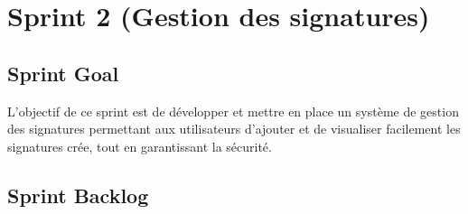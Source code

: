 \section{Sprint 2 (Gestion des signatures)}

\subsection{Sprint Goal}

L'objectif de ce sprint est de développer et mettre en place un système de gestion des signatures permettant aux utilisateurs d'ajouter et de visualiser facilement les signatures crée, tout en garantissant la sécurité.

\subsection{Sprint Backlog}


